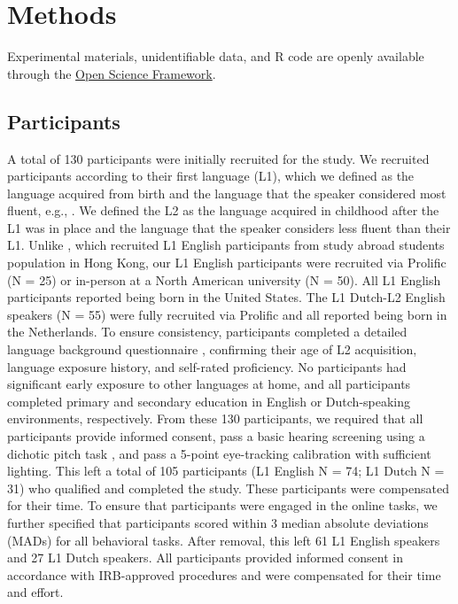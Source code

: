 \section{Methods}
Experimental materials, unidentifiable data, and R code are openly available through the 
\href{https://osf.io/wa4gv/?view_only=de113dbced6b46fab96ca8217b3c1ca6}{Open Science Framework}.


\subsection{Participants}
A total of 130 participants were initially recruited for the study. We recruited participants according to their first language (L1), which we defined as the language acquired from birth and the language that the speaker considered most fluent, e.g., \parencite{Brown_Tusmagambet_Rahming_Tu_DeSalvo_Wiener_2023}. We defined the L2 as the language acquired in childhood after the L1 was in place and the language that the speaker considers less fluent than their L1. Unlike \textcite{ge2021a}, which recruited L1 English participants from study abroad students population in Hong Kong, our L1 English participants were recruited via Prolific (N = 25) \parencite{prolific2024} or in-person at a North American university (N = 50). All L1 English participants reported being born in the United States. The L1 Dutch-L2 English speakers (N = 55) were fully recruited via Prolific and all reported being born in the Netherlands. To ensure consistency, participants completed a detailed language background questionnaire \parencite{Marian_Blumenfeld_Kaushanskaya_2007}, confirming their age of L2 acquisition, language exposure history, and self-rated proficiency. No participants had significant early exposure to other languages at home, and all participants completed primary and secondary education in English or Dutch-speaking environments, respectively. From these 130 participants, we required that all participants provide informed consent, pass a basic hearing screening using a dichotic pitch task \parencite{milne_2021}, and pass a 5-point eye-tracking calibration with sufficient lighting. This left a total of 105 participants (L1 English N = 74; L1 Dutch N = 31) who qualified and completed the study. These participants were compensated for their time. To ensure that participants were engaged in the online tasks, we further specified that participants scored within 3 median absolute deviations (MADs) \parencite{Leys_2013} for all behavioral tasks. After removal, this left 61 L1 English speakers and 27 L1 Dutch speakers. All participants provided informed consent in accordance with IRB-approved procedures and were compensated for their time and effort.

